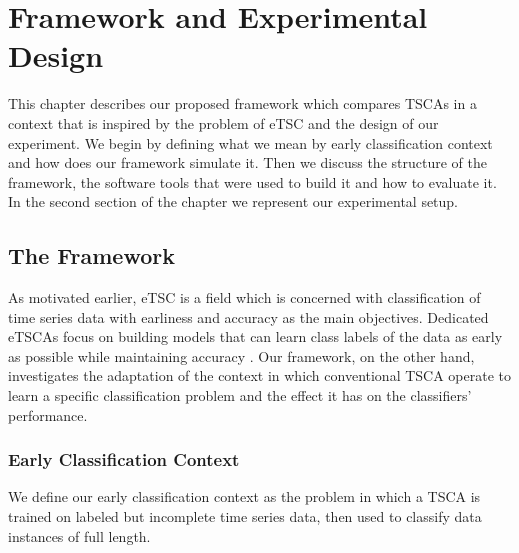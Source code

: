 \chapter{Framework and Experimental Design}
\label{ChapterFrameworkExperiment}
This chapter describes our proposed framework which compares TSCAs in a context that is inspired by the problem of eTSC and the design of our experiment.
We begin by defining what we mean by early classification context and how does our framework simulate it.
Then we discuss the structure of the framework, the software tools that were used to build it and how to evaluate it.
In the second section of the chapter we represent our experimental setup.

%

\section{The Framework}
\label{SectionNewFramework}
As motivated earlier, eTSC is a field which is concerned with classification of time series data with earliness and accuracy
as the main objectives. Dedicated eTSCAs focus on building models that can learn class labels of the data as early as possible
while maintaining accuracy \cite{mori2017early}.
Our framework, on the other hand, investigates the adaptation of the context in which conventional TSCA operate to learn a specific
classification problem and the effect it has on the classifiers' performance.

\subsection{Early Classification Context}
\label{SubsectionEarlyClassificationContext}
We define our early classification context as the problem in which a TSCA is trained on labeled but incomplete time series data, then
used to classify data instances of full length.


